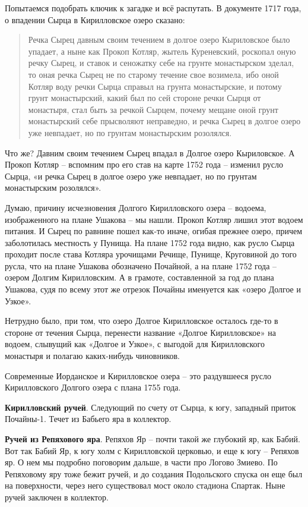 Попытаемся подобрать ключик к загадке и всё распутать. В документе 1717 года\cite[вып. 6, стр. 59]{histmatkiev}, о впадении Сырца в Кирилловское озеро сказано:

\begin{quotation}
Речка Сырец давным своим течением в долгое озеро Кыриловское было упадает, а ныне как Прокоп Котляр, жытель Куреневский, роскопал оную речку Сырец, и ставок и сеножатку себе на грунте монастырском зделал, то оная речка Сырец не по старому течение свое возимела, ибо оной Котляр воду речки Сырца справыл на грунта монастырские, и потому грунт монастырский, какий был по сей стороне речки Сырця от монастыря, стал быть за речкой Сырцем, почему мещане оной грунт монастырский себе прысволяют неправедно, и речка Сырец в долгое озеро уже невпадает, но по грунтам монастырским розолялся.
\end{quotation}

Что же? Давним своим течением Сырец впадал в Долгое озеро Кыриловское. А Прокоп Котляр – вспомним про его став на карте 1752 года – изменил русло Сырца, «и речка Сырец в долгое озеро уже невпадает, но по грунтам монастырским розолялся».

Думаю, причину исчезновения Долгого Кирилловского озера – водоема, изображенного на плане Ушакова – мы нашли. Прокоп Котляр лишил этот водоем питания. И Сырец по равнине пошел как-то иначе, огибая прежнее озеро, причем заболотилась местность у Пунища. На плане 1752 года видно, как русло Сырца проходит после става Котляра урочищами Речище, Пунище, Круговиной до того русла, что на плане Ушакова обозначено Почайной, а на плане 1752 года – озером Долгим Кирилловским. А в грамоте, составленной за год до плана Ушакова, судя по всему этот же отрезок Почайны именуется как «озеро Долгое и Узкое». 

Нетрудно было, при том, что озеро Долгое Кирилловское осталось где-то в стороне от течения Сырца, перенести название «Долгое Кирилловское» на водоем, слывущий как «Долгое и Узкое», с выгодой для Кирилловского монастыря и полагаю каких-нибудь чиновников.

Современные Иорданское и Кирилловское озера – это раздувшееся русло Кирилловского Долгого озера с плана 1755 года.

\textbf{Кирилловский ручей}. Следующий по счету от Сырца, к югу, западный приток Почайны-1. Течет из Бабьего яра в коллектор.

\textbf{Ручей из Репяхового яра}. Репяхов Яр – почти такой же глубокий яр, как Бабий. Вот так Бабий Яр, к югу холм с Кирилловской церковью, и еще к югу – Репяхов яр. О нем мы подробно поговорим дальше, в части про Логово Змиево. По Репяховому яру тоже бежит ручей, и до создания Подольского спуска он еще был на поверхности, через него существовал мост около стадиона Спартак. Ныне ручей заключен в коллектор.


